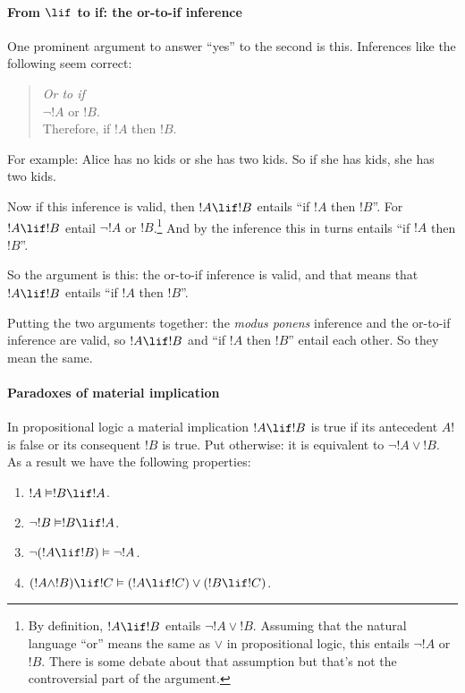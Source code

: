 \documentclass[../../../include/open-logic-section]{subfiles}
\begin{document}
\paragraph*{From $\lif$ to if: the or-to-if inference}

One prominent argument to answer ``yes'' to the second is this. Inferences like the following seem correct:

\begin{quote}
	\emph{Or to if}\\
	$\lnot !A$ or $!B$.\\
	Therefore, if $!A$ then $!B$.
\end{quote}

For example: Alice has no kids or she has two kids. So if she has kids, she has two kids.

Now if this inference is valid, then $!A \lif !B$ entails ``if $!A$ then $!B$''. For $!A \lif !B$ entail $\lnot !A$ or $!B$.\footnote{By definition, $!A \lif !B$ entails $\lnot !A \lor !B$. Assuming that the natural language ``or'' means the same as $\lor$ in propositional logic, this entails $\lnot !A$ or $!B$. There is some debate about that assumption but that's not the controversial part of the argument.} And by the inference this in turns entails ``if $!A$ then $!B$''. 

So the argument is this: the or-to-if inference is valid, and that means that $!A \lif !B$ entails ``if $!A$ then $!B$''. 

Putting the two arguments together: the \emph{modus ponens} inference and the or-to-if inference are valid, so $!A \lif !B$ and ``if $!A$ then $!B$'' entail each other. So they mean the same.

\paragraph*{Paradoxes of material implication}

In propositional logic a material implication $!A \lif !B$ is true if its antecedent $A!$ is false or its consequent $!B$ is true. Put otherwise: it is equivalent to $\lnot !A \lor !B$. As a result we have the following properties:

\begin{enumerate}
	\item $!A \Entails !B \lif !A$.
	\item $\lnot !B \Entails !B \lif !A$.
	\item $\lnot (!A \lif !B) \Entails \lnot !A$.
	\item $(!A \land !B) \lif !C \Entails (!A \lif !C) \lor (!B \lif !C)$.
\end{enumerate}
\end{document}
